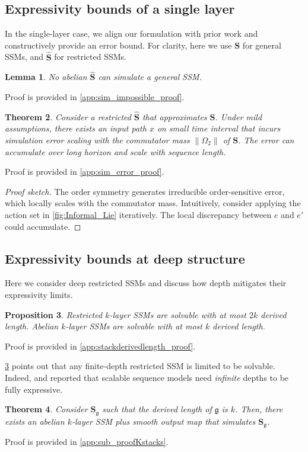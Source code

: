 \documentclass{article}
\theoremstyle{plain}
\newtheorem{theorem}{Theorem}[section]
\newtheorem{proposition}[theorem]{Proposition}
\newtheorem{lemma}[theorem]{Lemma}
\theoremstyle{definition}
\theoremstyle{remark}
\newcommand{\fr}[1]{\mathfrak{#1}}
\newcommand{\mbf}[1]{\mathbf{#1}}
\newcommand{\hbf}[1]{\hat{\mathbf{#1}}}
\begin{document}
\subsection{Expressivity bounds of a single layer}
\label{sec:theory_single_layer}
In the single-layer case, we align our formulation with prior work \cite{merrill2024illusion, liu2022transformers, anonymous2025the} and constructively provide an error bound.
For clarity, here we use $\mbf{S}$ for general SSMs,
and $\hbf{S}$ for restricted SSMs.
\begin{lemma}
\label{lem:sim_impossible}
No abelian $\hbf{S}$ can simulate a general SSM.
\end{lemma}
Proof is provided in \cref{app:sim_impossible_proof}.
\begin{theorem}
\label{thm:sim_error}
    Consider a restricted $\hbf{S}$ that approximates $\mbf{S}$.
    Under mild assumptions, there exists an input path $x$ on small time interval
    that incurs simulation error scaling with the commutator mass $\|\Omega_2\|$ of $\mbf{S}$.
    The error can
    accumulate over long horizon and scale with sequence length.
\end{theorem}
Proof is provided in \cref{app:sim_error_proof}.

\begin{proof}[Proof sketch]
The order symmetry generates irreducible
order-sensitive error, which locally scales with the commutator mass.
Intuitively, consider applying the action set in \cref{fig:Informal_Lie} iteratively.
The local discrepancy between $e$ and $e'$ could accumulate.
\end{proof}
\subsection{Expressivity bounds at deep structure}
\label{sec:theory_multi_layer}
Here we consider deep restricted SSMs
and discuss how depth mitigates their expressivity limits.
\begin{proposition}
\label{lem:stackderivedlength}
    Restricted $k$-layer SSMs are solvable with at most $2k$ derived length.
    Abelian $k$-layer SSMs are
    solvable with at most $k$ derived length.
\end{proposition}
Proof is provided in \cref{app:stackderivedlength_proof}.

\cref{lem:stackderivedlength} points out that any finite-depth restricted SSM is limited to be solvable.
Indeed, \citet{merrill2024illusion} and \citet{muca2024theoretical}
reported that scalable sequence models need
\emph{infinite} depths to be fully expressive.
\begin{theorem}
\label{thm:Kstacks}
    Consider $\mbf{S}_\fr{g}$ such that the derived length of $\fr{g}$ is $k$.
    Then, there exists an abelian $k$-layer SSM plus smooth output map
   that simulates $\mbf{S}_\fr{g}$.
\end{theorem}
Proof is provided in \cref{app:sub_proofKstacks}.
\end{document}

